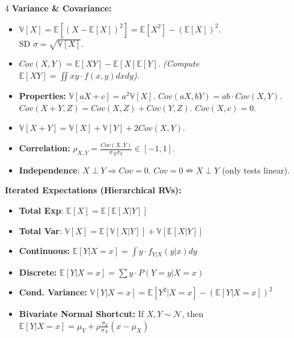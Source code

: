 \documentclass[9pt]{extarticle}
\begin{document}
\begin{multicols*}{4}
\textbf{Variance \& Covariance:}
\begin{itemize}
    \item $\mathbb{V}[X] =  \mathbb{E}[(X - \mathbb{E}[X])^2] = \mathbb{E}[X^2] - (\mathbb{E}[X])^2$.\\
    SD $\sigma = \sqrt{\mathbb{V}[X]}$.
    \item $Cov(X,Y) = \mathbb{E}[XY] - \mathbb{E}[X]\mathbb{E}[Y]$. \quad \textit{(Compute $\mathbb{E}[XY] = \iint xy \cdot f(x,y) dxdy$)}.
    \item \textbf{Properties:} $\mathbb{V}[aX+c] = a^2\mathbb{V}[X]$. $Cov(aX, bY) = ab \cdot Cov(X,Y)$. $Cov(X+Y, Z) = Cov(X,Z) + Cov(Y,Z)$. $Cov(X, c) = 0$.
    \item $\mathbb{V}[X+Y] = \mathbb{V}[X] + \mathbb{V}[Y] + 2Cov(X,Y)$.
    \item \textbf{Correlation:} $\rho_{X,Y} = \frac{Cov(X,Y)}{\sigma_X \sigma_Y} \in [-1, 1]$.
    \item \textbf{Independence}: $X \perp Y \Rightarrow Cov=0$. \quad $Cov=0 \nRightarrow X \perp Y$ (only tests linear).
\end{itemize}
\textbf{Iterated Expectations (Hierarchical RVs):}
\begin{itemize}
    \item \textbf{Total Exp}: $\mathbb{E}[X] = \mathbb{E}[\mathbb{E}[X|Y]]$
    \item \textbf{Total Var}: $\mathbb{V}[X] = \mathbb{E}[\mathbb{V}[X|Y]] + \mathbb{V}[\mathbb{E}[X|Y]]$
    \item \textbf{Continuous:} $\mathbb{E}[Y|X{=}x] = \int y \cdot f_{Y|X}(y|x) dy$
    \item \textbf{Discrete:} $\mathbb{E}[Y|X{=}x] = \sum y \cdot P(Y{=}y|X{=}x)$
    \item \textbf{Cond. Variance:} $\mathbb{V}[Y|X{=}x] = \mathbb{E}[Y^2|X{=}x] - (\mathbb{E}[Y|X{=}x])^2$
    \item \textbf{Bivariate Normal Shortcut:} If $X,Y \sim \mathcal{N}$, then $\mathbb{E}[Y|X{=}x] = \mu_Y + \rho \frac{\sigma_Y}{\sigma_X} (x - \mu_X)$
\end{itemize}


\end{multicols*}
\end{document}
